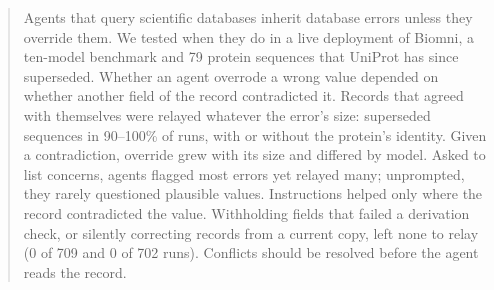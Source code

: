 \begin{abstract}
Agents that query scientific databases inherit database errors unless they override them. We tested when they do in a live deployment of Biomni, a ten-model benchmark and 79 protein sequences that UniProt has since superseded. Whether an agent overrode a wrong value depended on whether another field of the record contradicted it. Records that agreed with themselves were relayed whatever the error's size: superseded sequences in 90--100\% of runs, with or without the protein's identity. Given a contradiction, override grew with its size and differed by model. Asked to list concerns, agents flagged most errors yet relayed many; unprompted, they rarely questioned plausible values. Instructions helped only where the record contradicted the value. Withholding fields that failed a derivation check, or silently correcting records from a current copy, left none to relay (0 of 709 and 0 of 702 runs). Conflicts should be resolved before the agent reads the record.
\end{abstract}
